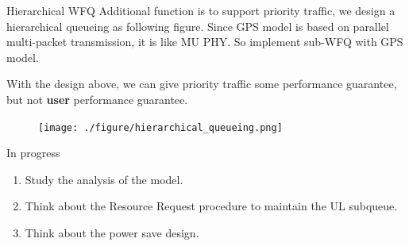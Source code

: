 \documentclass[10pt]{beamer}
\begin{document}
\begin{frame}{Hierarchical WFQ}
Additional function is to support priority traffic, we design a hierarchical queueing as following figure. 
Since GPS model is based on parallel multi-packet transmission, it is like MU PHY. 
So implement sub-WFQ with GPS model.

With the design above, we can give priority traffic some performance guarantee, but not \textbf{user} performance guarantee. 
\begin{figure}
\texttt{[image: ./figure/hierarchical\_queueing.png]}
\end{figure}
\end{frame}

\begin{frame}{In progress}
\begin{enumerate}
\item
Study the analysis of the model. 
\item
Think about the Resource Request procedure to maintain the 
UL subqueue. 
\item
Think about the power save design. 
\end{enumerate}
\end{frame}
%    
%    

\end{document}
